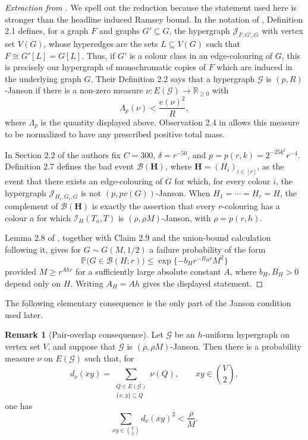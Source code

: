 \documentclass[11pt,reqno]{amsart}
\numberwithin{equation}{section}
\theoremstyle{plain}
\theoremstyle{definition}
\newtheorem{remark}[theorem]{Remark}
\newcommand{\Prb}{\mathbb P}
\newcommand{\calG}{\mathcal G}
\newcommand{\calI}{\mathcal I}
\begin{document}
\begin{proof}[Extraction from \cite{ACDFM}]
We spell out the reduction because the statement used here is stronger than
the headline induced Ramsey bound.  In the notation of \cite{ACDFM}, Definition
2.1 defines, for a graph $F$ and graphs $G'\subseteq G$, the hypergraph
$\mathcal J_{F,G',G}$ with vertex set $V(G)$, whose hyperedges are the sets
$L\subseteq V(G)$ such that $F\cong G'[L]=G[L]$.  Thus, if $G'$ is a
colour class in an edge-colouring of $G$, this is precisely our hypergraph of
monochromatic copies of $F$ which are induced in the underlying graph $G$.
Their Definition 2.2 says that a hypergraph $\mathcal G$ is $(p,R)$-Janson
if there is a non-zero measure $\nu:E(\mathcal G)\to\mathbb R_{\ge0}$ with
$$
        \Lambda_p(\nu)<\frac{e(\nu)^2}{R},
$$
where $\Lambda_p$ is the quantity displayed above.  Observation 2.4 in
\cite{ACDFM} allows this measure to be normalized to have any prescribed
positive total mass.

In Section 2.2 of \cite{ACDFM} the authors fix $C=300$, $\delta=r^{-50}$, and $p=p(r,k)=2^{-25k^2}r^{-4}$.
Definition 2.7 defines the bad event $\mathcal B(\mathbf H)$, where
$\mathbf H=(H_i)_{i\in[r]}$, as the event that there exists an edge-colouring
of $G$ for which, for every colour $i$, the hypergraph
$\mathcal J_{H_i,G_i,G}$ is not $(p,pv(G))$-Janson.  When
$H_1=\cdots=H_r=H$, the complement of $\mathcal B(\mathbf H)$ is exactly
the assertion that every $r$-colouring has a colour $a$ for which
$\calI_H(T_a,T)$ is $(\rho,\rho M)$-Janson, with $\rho=p(r,h)$.

Lemma 2.8 of \cite{ACDFM}, together with Claim 2.9 and the union-bound
calculation following it, gives for $G\sim G(M,1/2)$ a failure probability of the form
$$
        \Prb\bigl(G\in\mathcal B(H;r)\bigr)
        \le \exp\{-b_H r^{-B_Hr}M^2\}
$$
provided $M\ge r^{Ahr}$ for a sufficiently large absolute constant $A$,
where $b_H,B_H>0$ depend only on $H$.  Writing $A_H=Ah$ gives the
displayed statement.
\end{proof}

The following elementary consequence is the only part of the Janson condition
used later.

\begin{remark}[Pair-overlap consequence]
\label{lem:pair-overlap}
Let $\calG$ be an $h$-uniform hypergraph on vertex set $V$, and suppose
that $\calG$ is $(\rho,\rho M)$-Janson.  Then there is a probability
measure $\nu$ on $E(\calG)$ such that, for
$$
        d_\nu(xy)=
        \sum_{\substack{Q\in E(\calG)\\ \{x,y\}\subseteq Q}}\nu(Q),
        \qquad xy\in\binom V2,
$$
one has
$$
        \sum_{xy\in\binom V2} d_\nu(xy)^2<\frac{\rho}{M}.
$$
\end{remark}
\end{document}
